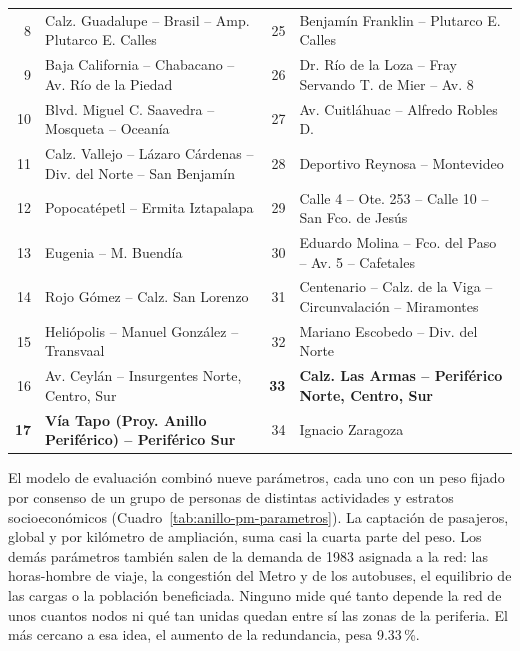 \begin{table}[H]
\begin{tabularx}{\textwidth}{|r|X|r|X|}
        8  & Calz. Guadalupe -- Brasil -- Amp. Plutarco E. Calles &
        25 & Benjamín Franklin -- Plutarco E. Calles \\
        9  & Baja California -- Chabacano -- Av. Río de la Piedad &
        26 & Dr. Río de la Loza -- Fray Servando T. de Mier -- Av. 8 \\
        10 & Blvd. Miguel C. Saavedra -- Mosqueta -- Oceanía &
        27 & Av. Cuitláhuac -- Alfredo Robles D. \\
        11 & Calz. Vallejo -- Lázaro Cárdenas -- Div. del Norte -- San Benjamín &
        28 & Deportivo Reynosa -- Montevideo \\
        12 & Popocatépetl -- Ermita Iztapalapa &
        29 & Calle 4 -- Ote. 253 -- Calle 10 -- San Fco. de Jesús \\
        13 & Eugenia -- M. Buendía &
        30 & Eduardo Molina -- Fco. del Paso -- Av. 5 -- Cafetales \\
        14 & Rojo Gómez -- Calz. San Lorenzo &
        31 & Centenario -- Calz. de la Viga -- Circunvalación -- Miramontes \\
        15 & Heliópolis -- Manuel González -- Transvaal &
        32 & Mariano Escobedo -- Div. del Norte \\
        16 & Av. Ceylán -- Insurgentes Norte, Centro, Sur &
        \textbf{33} & \textbf{Calz. Las Armas -- Periférico Norte, Centro, Sur} \\
        \textbf{17} & \textbf{Vía Tapo (Proy. Anillo Periférico) -- Periférico Sur} &
        34 & Ignacio Zaragoza \\
        \hline
    \end{tabularx}
\end{table}

El modelo de evaluación combinó nueve parámetros, cada uno con un peso fijado
por consenso de un grupo de personas de distintas actividades y estratos
socioeconómicos (Cuadro~\ref{tab:anillo-pm-parametros}). La captación de
pasajeros, global y por kilómetro de ampliación, suma casi la cuarta parte del
peso. Los demás parámetros también salen de la demanda de 1983 asignada a la
red: las horas-hombre de viaje, la congestión del Metro y de los autobuses, el
equilibrio de las cargas o la población beneficiada. Ninguno mide qué tanto
depende la red de unos cuantos nodos ni qué tan unidas quedan entre sí las
zonas de la periferia. El más cercano a esa idea, el aumento de la redundancia,
pesa 9.33\,\%.

